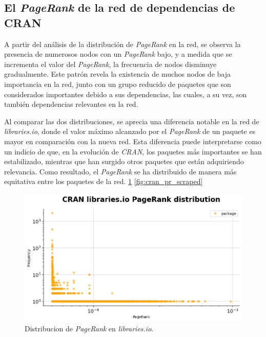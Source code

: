 \subsection{El \textit{PageRank} de la red de dependencias de CRAN}

A partir del análisis de la distribución de \textit{PageRank} en la red, se observa la presencia
de numerosos nodos con un \textit{PageRank} bajo, y a medida que se incrementa el valor del
\textit{PageRank}, la frecuencia de nodos disminuye gradualmente. Este patrón revela la
existencia de muchos nodos de baja importancia en la red, junto con un grupo reducido de
paquetes que son considerados importantes debido a sus dependencias, las cuales, a su vez,
son también dependencias relevantes en la red.

Al comparar las dos distribuciones, se aprecia una diferencia notable en la red
de \textit{libraries.io}, donde el valor máximo alcanzado por el \textit{PageRank} de
un paquete es mayor en comparación con la nueva red. Esta diferencia puede interpretarse
como un indicio de que, en la evolución de \textit{CRAN}, los paquetes más importantes
se han estabilizado, mientras que han surgido otros paquetes que están adquiriendo
relevancia. Como resultado, el \textit{PageRank} se ha distribuido de manera más equitativa
entre los paquetes de la red. \ref{fig:cran_pr_libio} \ref{fig:cran_pr_scraped}

\begin{figure}[h!]
    \begin{center}
        \includegraphics[width=1\textwidth]{img/cran/pr.png}
        \caption{Distribucion de \textit{PageRank} en \textit{libraries.io}.}
        \label{fig:cran_pr_libio}
    \end{center}
\end{figure}

